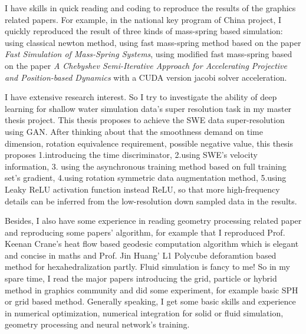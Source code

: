 \documentclass[a4paper,12pt]{article}
\begin{document}
I have skills in quick reading and coding to reproduce the results of the graphics related papers. For example, in the national key program of China project, I quickly reproduced the result of three kinds of mass-spring based simulation: using classical newton method, using fast mass-spring method based on the paper \textit{Fast Simulation of Mass-Spring Systems}, using modified fast mass-spring based on the paper \textit{A Chebyshev Semi-Iterative Approach for Accelerating Projective and Position-based Dynamics} with a CUDA version jacobi solver acceleration.\vspace{1.2ex} %

I have extensive research interest. So I try to investigate the ability of deep learning for shallow water simulation data's super resolution task in my master thesis project. This thesis proposes to achieve the SWE data super-resolution using GAN. After thinking about that the smoothness demand on time dimension, rotation equivalence requirement, possible negative value, this thesis proposes 1.introducing the time discriminator, 2.using SWE's velocity information, 3. using the asynchronous training method based on full training set's gradient, 4.using rotation symmetric data augmentation method, 5.using Leaky ReLU activation function instead ReLU, so that more high-frequency details can be inferred from the low-resolution down sampled data in the results.\vspace{1.2ex}  %

Besides, I also have some experience in reading geometry processing related paper and reproducing some papers' algorithm, for example that I reproduced Prof. Keenan Crane's heat flow based geodesic computation algorithm which is elegant and concise in maths and Prof. Jin Huang' L1 Polycube deforamtion based method for hexahedralization partly. Fluid simulation is fancy to me! So in my spare time, I read the major papers introducing the grid, particle or hybrid method in graphics community and did some experiment, for example basic SPH or grid based method. Generally speaking, I get some basic skills and experience in numerical optimization, numerical integration for solid or fluid simulation, geometry processing and neural network's training.\vspace{1.2ex}
\end{document}
